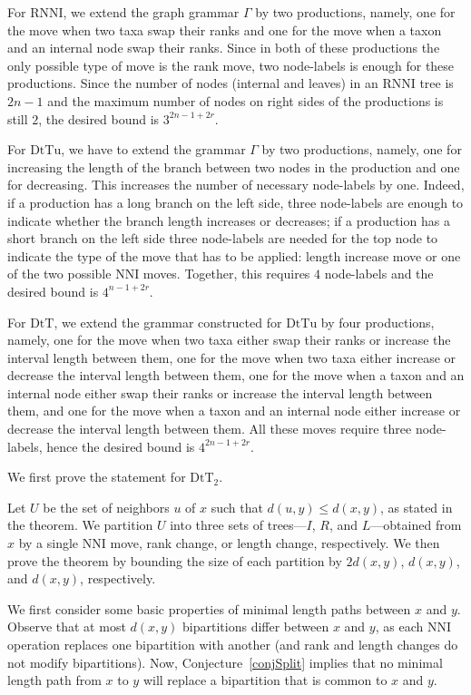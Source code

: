 \documentclass[11pt]{amsart}
\theoremstyle{definition}
\newcommand{\nni}{\mathrm{NNI}}
\newcommand{\rnni}{\mathrm{RNNI}}
\newcommand{\dtt}{\mathrm{DtT}}
\newcommand{\dttu}{\mathrm{DtTu}}
\begin{document}
For $\rnni$, we extend the graph grammar $\Gamma$ by two productions, namely, one for the move when two taxa swap their ranks and one for the move when a taxon and an internal node swap their ranks.
Since in both of these productions the only possible type of move is the rank move, two node-labels is enough for these productions.
Since the number of nodes (internal and leaves) in an $\rnni$ tree is $2n - 1$ and the maximum number of nodes on right sides of the productions is still $2$, the desired bound is $3^{2n-1 + 2r}$.

For $\dttu$, we have to extend the grammar $\Gamma$ by two productions, namely, one for increasing the length of the branch between two nodes in the production and one for decreasing.
This increases the number of necessary node-labels by one.
Indeed, if a production has a long branch on the left side, three node-labels are enough to indicate whether the branch length increases or decreases; if a production has a short branch on the left side three node-labels are needed for the top node to indicate the type of the move that has to be applied: length increase move or one of the two possible $\nni$ moves.
Together, this requires $4$ node-labels and the desired bound is $4^{n-1 + 2r}$.

For $\dtt$, we extend the grammar constructed for $\dttu$ by four productions, namely, one for the move when two taxa either swap their ranks or increase the interval length between them, one for the move when two taxa either increase or decrease the interval length between them, one for the move when a taxon and an internal node either swap their ranks or increase the interval length between them, and one for the move when a taxon and an internal node either increase or decrease the interval length between them.
All these moves require three node-labels, hence the desired bound is $4^{2n-1 + 2r}$.
\endproof

We first prove the statement for $\dtt_2$.

Let $U$ be the set of neighbors $u$ of $x$ such that $d(u,y) \le d(x,y)$, as stated in the theorem.
We partition $U$ into three sets of trees---$I$, $R$, and $L$---obtained from $x$ by a single $\nni$ move, rank change, or length change, respectively.
We then prove the theorem by bounding the size of each partition by $2d(x,y)$, $d(x,y)$, and $d(x,y)$, respectively.

We first consider some basic properties of minimal length paths between $x$ and $y$.
Observe that at most $d(x,y)$ bipartitions differ between $x$ and $y$, as each $\nni$ operation replaces one bipartition with another (and rank and length changes do not modify bipartitions).
Now, Conjecture~\ref{conjSplit} implies that no minimal length path from $x$ to $y$ will replace a bipartition that is common to $x$ and $y$.
\end{document}
